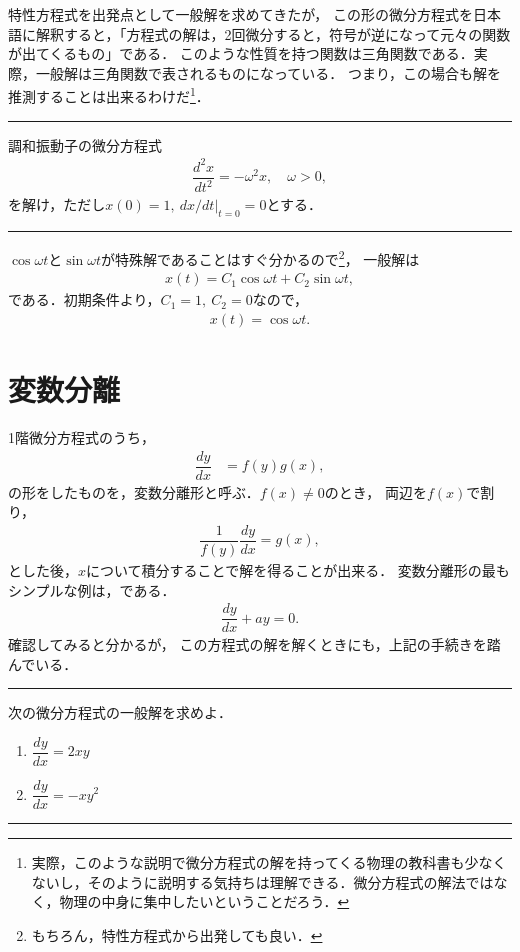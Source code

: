特性方程式を出発点として一般解を求めてきたが，
この形の微分方程式を日本語に解釈すると，「方程式の解は，2回微分すると，符号が逆になって元々の関数が出てくるもの」である．
このような性質を持つ関数は三角関数である．実際，一般解は三角関数で表されるものになっている．
つまり，この場合も解を推測することは出来るわけだ\footnote{実際，このような説明で微分方程式の解を持ってくる物理の教科書も少なくないし，そのように説明する気持ちは理解できる．微分方程式の解法ではなく，物理の中身に集中したいということだろう．}．
%
\newpage
%
\hrule
\reidai
調和振動子の微分方程式
\begin{align}
 \dfrac{d^2x}{dt^2} = -\omega^2 x, \quad \omega > 0, 
\end{align}
を解け，ただし$x(0)=1,~dx/dt|_{t=0}=0$とする．
\vspace*{.2cm}
\hrule
\vspace*{.2cm}
%
$\cos\omega t$と$\sin\omega t$が特殊解であることはすぐ分かるので\footnote{もちろん，特性方程式から出発しても良い．}，
一般解は
\begin{align}
 x(t) = C_1 \cos \omega t + C_2 \sin \omega t, 
\end{align}
である．初期条件より，$C_1=1,~C_2=0$なので，
\begin{align}
 x(t) = \cos \omega t. 
\end{align}

\newpage
%

%
\section{変数分離}
%
1階微分方程式のうち，
\begin{align}
  \dfrac{dy}{dx} & =f\left(y\right)g\left(x\right),
\end{align}
の形をしたものを，変数分離形と呼ぶ．$f\left(x\right) \neq 0$のとき，
両辺を$f\left(x\right)$で割り，
\begin{align}
  \dfrac{1}{f\left(y\right)}\dfrac{dy}{dx} = g\left(x\right),
\end{align}
とした後，$x$について積分することで解を得ることが出来る．
変数分離形の最もシンプルな例は，である．
\begin{align}
 \dfrac{dy}{dx} + ay = 0. 
\end{align}
確認してみると分かるが，
この方程式の解を解くときにも，上記の手続きを踏んでいる．
%
\newpage
%
\hrule
\reidai

次の微分方程式の一般解を求めよ．
\begin{enumerate}[(1)]
  \item  $\dfrac{dy}{dx} = 2xy$
  \item  $\dfrac{dy}{dx} = -xy^2$
\end{enumerate}
\vspace*{.2cm}
\hrule
\vspace*{.2cm}

